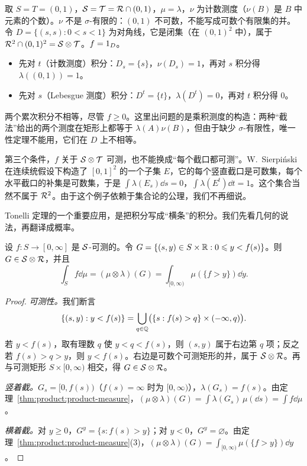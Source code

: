 \begin{example}\label{ex:product:not-sigma-finite}
取 $S=T=(0,1)$，$\mathcal{S}=\mathcal{T}=\mathcal{R}\cap(0,1)$，$\mu=\lambda$，$\nu$ 为计数测度（$\nu(B)$ 是 $B$ 中元素的个数）。$\nu$ 不是 $\sigma$-有限的：$(0,1)$ 不可数，不能写成可数个有限集的并。令 $D=\{(s,s):0<s<1\}$ 为对角线，它是闭集（在 $(0,1)^2$ 中），属于 $\mathcal{R}^2\cap(0,1)^2=\mathcal{S}\otimes\mathcal{T}$。$f=1_D$。
\begin{itemize}
\item 先对 $t$（计数测度）积分：$D_s=\{s\}$，$\nu(D_s)=1$，再对 $s$ 积分得 $\lambda((0,1))=1$。
\item 先对 $s$（Lebesgue 测度）积分：$D^t=\{t\}$，$\lambda(D^t)=0$，再对 $t$ 积分得 $0$。
\end{itemize}
两个累次积分不相等，尽管 $f\geqslant0$。这里出问题的是乘积测度的构造：两种“截法”给出的两个测度在矩形上都等于 $\lambda(A)\nu(B)$，但由于缺少 $\sigma$-有限性，唯一性定理不能用，它们在 $D$ 上不相等。
\end{example}

\begin{remark}[可测性的条件★]
第三个条件，$f$ 关于 $\mathcal{S}\otimes\mathcal{T}$ 可测，也不能换成“每个截口都可测”。W.\ Sierpiński 在连续统假设下构造了 $[0,1]^2$ 的一个子集 $E$，它的每个竖直截口是可数集，每个水平截口的补集是可数集，于是 $\int\lambda(E_s)\dd s=0$，$\int\lambda(E^t)\dd t=1$。这个集合当然不属于 $\mathcal{R}^2$。由于这个例子依赖于集合论的公理，我们不再细说。
\end{remark}


Tonelli 定理的一个重要应用，是把积分写成“横条”的积分。我们先看几何的说法，再翻译成概率。

\begin{proposition}[图像下方的面积]\label{prop:product:area-under-graph}
设 $f:S\to[0,\infty]$ 是 $\mathcal{S}$-可测的。令 $G=\{(s,y)\in S\times\mathbb{R}:0\leqslant y<f(s)\}$。则 $G\in\mathcal{S}\otimes\mathcal{R}$，并且
\[
\int_Sf\dd\mu=(\mu\otimes\lambda)(G)=\int_{[0,\infty)}\mu(\{f>y\})\dd y .
\]
\end{proposition}
\begin{proof}
\emph{可测性。}我们断言
\[
\{(s,y):y<f(s)\}=\bigcup_{q\in\mathbb{Q}}\bigl(\{s:f(s)>q\}\times(-\infty,q)\bigr).
\]
若 $y<f(s)$，取有理数 $q$ 使 $y<q<f(s)$，则 $(s,y)$ 属于右边第 $q$ 项；反之若 $f(s)>q>y$，则 $y<f(s)$。右边是可数个可测矩形的并，属于 $\mathcal{S}\otimes\mathcal{R}$。再与可测矩形 $S\times[0,\infty)$ 相交，得 $G\in\mathcal{S}\otimes\mathcal{R}$。

\emph{竖着截。}$G_s=[0,f(s))$（$f(s)=\infty$ 时为 $[0,\infty)$），$\lambda(G_s)=f(s)$。由定理~\ref{thm:product:product-measure}，$(\mu\otimes\lambda)(G)=\int\lambda(G_s)\,\mu(\dd s)=\int f\dd\mu$。

\emph{横着截。}对 $y\geqslant0$，$G^y=\{s:f(s)>y\}$；对 $y<0$，$G^y=\varnothing$。由定理~\ref{thm:product:product-measure}(3)，$(\mu\otimes\lambda)(G)=\int_{[0,\infty)}\mu(\{f>y\})\dd y$。
\end{proof}

